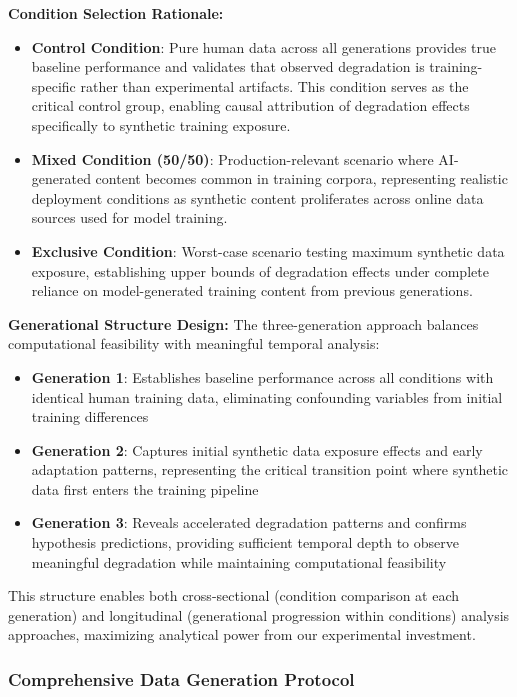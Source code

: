 \documentclass{article}
\begin{document}
\textbf{Condition Selection Rationale:}
\begin{itemize}
    \item \textbf{Control Condition}: Pure human data across all generations provides true baseline performance and validates that observed degradation is training-specific rather than experimental artifacts. This condition serves as the critical control group, enabling causal attribution of degradation effects specifically to synthetic training exposure.
    \item \textbf{Mixed Condition (50/50)}: Production-relevant scenario where AI-generated content becomes common in training corpora, representing realistic deployment conditions as synthetic content proliferates across online data sources used for model training.
    \item \textbf{Exclusive Condition}: Worst-case scenario testing maximum synthetic data exposure, establishing upper bounds of degradation effects under complete reliance on model-generated training content from previous generations.
\end{itemize}

\textbf{Generational Structure Design:}
The three-generation approach balances computational feasibility with meaningful temporal analysis:
\begin{itemize}
    \item \textbf{Generation 1}: Establishes baseline performance across all conditions with identical human training data, eliminating confounding variables from initial training differences
    \item \textbf{Generation 2}: Captures initial synthetic data exposure effects and early adaptation patterns, representing the critical transition point where synthetic data first enters the training pipeline
    \item \textbf{Generation 3}: Reveals accelerated degradation patterns and confirms hypothesis predictions, providing sufficient temporal depth to observe meaningful degradation while maintaining computational feasibility
\end{itemize}

This structure enables both cross-sectional (condition comparison at each generation) and longitudinal (generational progression within conditions) analysis approaches, maximizing analytical power from our experimental investment.

\subsubsection{Comprehensive Data Generation Protocol}
\end{document}
